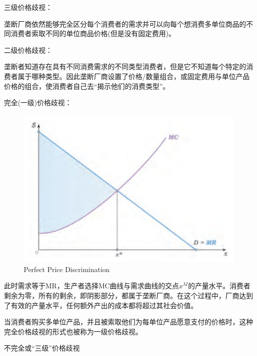 \documentclass{article}
\begin{document}
三级价格歧视：

垄断厂商依然能够完全区分每个消费者的需求并可以向每个想消费多单位商品的不同消费者索取不同的单位商品价格(但是没有固定费用)。

二级价格歧视：

垄断者知道存在具有不同消费需求的不同类型消费者，但是它不知道每个特定的消费者属于哪种类型。因此垄断厂商设置了价格/数量组合，或固定费用与单位产品价格的组合，使消费者自己去“揭示他们的消费类型”。

\hspace*{\fill}

完全(一级)价格歧视：

\begin{figure}[H] %
	\centering %
	\includegraphics[width=1\textwidth]{23_3} %
	\caption{Perfect Price Discrimination} %
	\label{Fig.main4} %
\end{figure}

此时需求等于MR，生产者选择MC曲线与需求曲线的交点$ x^M $的产量水平。消费者剩余为零，所有的剩余，即阴影部分，都属于垄断厂商。在这个过程中，厂商达到了有效的产量水平，任何额外产出的成本都将超过其社会价值。

当消费者购买多单位产品，并且被索取他们为每单位产品愿意支付的价格时，这种完全价格歧视的形式也被称为一级价格歧视。

不完全或“三级”价格歧视
\end{document}
